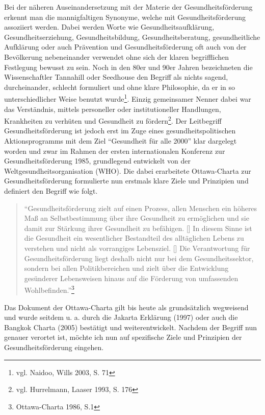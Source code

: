 Bei der näheren Auseinandersetzung mit der Materie der Gesundheitsförderung erkennt man die mannigfaltigen Synonyme, welche mit Gesundheitsförderung assoziiert werden. Dabei werden Worte wie Gesundheitsaufklärung, Gesundheitserziehung, Gesundheitsbildung, Gesundheitsberatung, gesundheitliche Aufklärung oder auch Prävention und Gesundheitsförderung oft auch von der Bevölkerung nebeneinander verwendet ohne sich der klaren begrifflichen Festlegung bewusst zu sein. Noch in den 80er und 90er Jahren bezeichneten die Wissenschaftler Tannahill oder Seedhouse den Begriff als nichts sagend, durcheinander, schlecht formuliert und ohne klare Philosophie, da er in so unterschiedlicher Weise benutzt wurde\footnote{vgl. Naidoo, Wills 2003, S. 71}. Einzig gemeinsamer Nenner dabei war das Verständnis, mittels personeller oder institutioneller Handlungen, Krankheiten zu verhüten und Gesundheit zu fördern\footnote{vgl. Hurrelmann, Laaser 1993, S. 176}. Der Leitbegriff Gesundheitsförderung ist jedoch erst im Zuge eines gesundheitspolitischen Aktionsprogramms mit dem Ziel "`Gesundheit für alle 2000"' klar dargelegt worden und zwar im Rahmen der ersten internationalen Konferenz zur Gesundheitsförderung 1985, grundlegend entwickelt von der Weltgesundheitsorganisation (WHO). Die dabei erarbeitete Ottawa-Charta zur Gesundheitsförderung formulierte nun erstmals klare Ziele und Prinzipien und definiert den Begriff wie folgt.

\begin{quotation}
"`Gesundheitsförderung zielt auf einen Prozess, allen Menschen ein höheres Maß an Selbstbestimmung über ihre Gesundheit zu ermöglichen und sie damit zur Stärkung ihrer Gesundheit zu befähigen. [\punkte] In diesem Sinne ist die Gesundheit ein wesentlicher Bestandteil des alltäglichen Lebens zu verstehen und nicht als vorrangiges Lebensziel. [\punkte] Die Verantwortung für Gesundheitsförderung liegt deshalb nicht nur bei dem Gesundheitssektor, sondern bei allen Politikbereichen und zielt über die Entwicklung gesünderer Lebensweisen hinaus auf die Förderung von umfassenden Wohlbefinden."'\footnote{Ottawa-Charta 1986, S.1}
\end{quotation}

Das Dokument der Ottawa-Charta gilt bis heute als grundsätzlich wegweisend und wurde seitdem u. a. durch die Jakarta Erklärung (1997) oder auch die Bangkok Charta (2005) bestätigt und weiterentwickelt.
Nachdem der Begriff nun genauer verortet ist, möchte ich nun auf spezifische Ziele und Prinzipien der Gesundheitsförderung eingehen.

